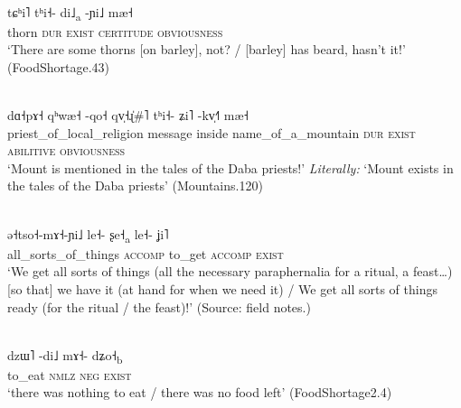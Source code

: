 \begin{exe}
	\ex
	\label{ex:barley}
	\\
	\gll tɕʰi˥		tʰi˧-			di˩\textsubscript{a}		-ɲi˩		mæ˧\\
	thorn		\textsc{dur}	\textsc{exist}		\textsc{certitude}	\textsc{obviousness}\\
	\glt ‘There are some thorns [on barley], not? / [barley] has beard, hasn't it!’ (FoodShortage.43)
\end{exe}

\begin{exe}
	\ex
	\label{ex:instory}
	\\
	\gll dɑ˧pɤ˧						qʰwæ˧		-qo˧		 qv̩˧ɻ̍\#˥						tʰi˧-				ʑi˥						-kv̩˧˥										mæ˧\\
	priest\_of\_local\_religion		message		inside		name\_of\_a\_mountain	\textsc{dur}	\textsc{exist}		\textsc{abilitive}		\textsc{obviousness}\\
	\glt ‘Mount  is mentioned in the tales of the Daba priests!’ \textit{Literally:} ‘Mount  exists in the tales of the Daba priests’ (Mountains.120)
\end{exe}

\begin{exe}
	\ex
	\label{ex:athand}
	\\
	\gll ə˧tso˧-mɤ˧-ɲi˩		le˧-		ʂe˧\textsubscript{a}		le˧-	ʝi˥\\
	all\_sorts\_of\_things	\textsc{accomp}		to\_get		\textsc{accomp}		\textsc{exist}\\
	\glt ‘We get all sorts of things (all the necessary paraphernalia for a ritual, a feast{\dots}) [so that] we have it (at hand for when we need it) / We get all sorts of things ready (for the ritual / the feast)!’ (Source: field notes.)
\end{exe}

\begin{exe}
	\ex
	\label{ex:nothingtoeat}
	\\
	\gll dzɯ˥		-di˩				mɤ˧-			dʑo˧\textsubscript{b}\\
	to\_eat			\textsc{nmlz}		\textsc{neg}		\textsc{exist}\\
	\glt ‘there was nothing to eat / there was no food left’ (FoodShortage2.4)
\end{exe}


